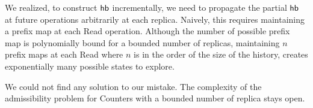 We realized, to construct $\textsf{hb}$ incrementally, we need to propagate the partial $\textsf{hb}$ at future operations arbitrarily at each replica. Naively, this requires maintaining a prefix map at each \textrm{Read} operation. Although the number of possible prefix map is polynomially bound for a bounded number of replicas, maintaining $n$ prefix maps at each \textrm{Read} where $n$ is in the order of the size of the history, creates exponentially many possible states to explore.

We could not find any solution to our mistake. The complexity of the admissibility problem for Counters with a bounded number of replica stays open.